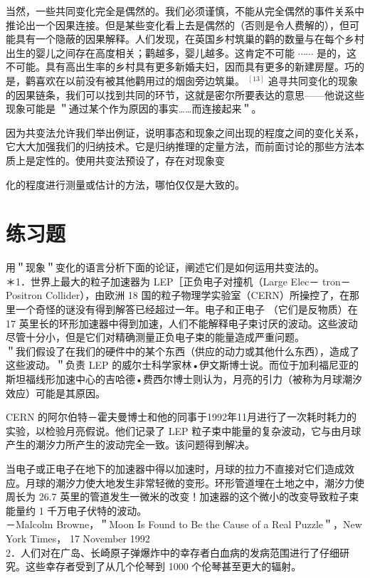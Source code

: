 当然，一些共同变化完全是偶然的。我们必须谨慎，不能从完全偶然的事件关系中推论出一个因果连接。但是某些变化看上去是偶然的（否则是令人费解的），但可能具有一个隐蔽的因果解释。人们发现，在英国乡村筑巢的鹳的数量与在每个乡村出生的婴儿之间存在高度相关；鹳越多，婴儿越多。这肯定不可能 $\cdots \cdots$ 是的，这不可能。具有高出生率的乡村具有更多新婚夫妇，因而具有更多的新建房屋。巧的是，鹳喜欢在以前没有被其他鹳用过的烟囱旁边筑巢。 ${ }^{[13]}$ 追寻共同变化的现象的因果链条，我们可以找到共同的环节，这就是密尔所要表达的意思——他说这些现象可能是 ＂通过某个作为原因的事实……而连接起来＂。

因为共变法允许我们举出例证，说明事态和现象之间出现的程度之间的变化关系，它大大加强我们的归纳技术。它是归纳推理的定量方法，而前面讨论的那些方法本质上是定性的。使用共变法预设了，存在对现象变

化的程度进行测量或估计的方法，哪怕仅仅是大致的。

\section*{练习题}
用＂现象＂变化的语言分析下面的论证，阐述它们是如何运用共变法的。\\
＊1．世界上最大的粒子加速器为 LEP［正负电子对撞机（Large Elec－ tron－Positron Collider），由欧洲 18 国的粒子物理学实验室（CERN）所操控了，在那里一个奇怪的谜没有得到解答已经超过一年。电子和正电子 （它们是反物质）在 17 英里长的环形加速器中得到加速，人们不能解释电子束讨厌的波动。这些波动尽管十分小，但是它们对精确测量正负电子束的能量造成严重问题。\\
＂我们假设了在我们的硬件中的某个东西（供应的动力或其他什么东西），造成了这些波动。＂负责 LEP 的威尔士科学家林•伊文斯博士说。而位于加利福尼亚的斯坦福线形加速中心的吉哈德•费西尔博士则认为，月亮的引力（被称为月球潮汐效应）可能是其原因。

CERN 的阿尔伯特－霍夫曼博士和他的同事于1992年11月进行了一次耗时耗力的实验，以检验月亮假说。他们记录了 LEP 粒子束中能量的复杂波动，它与由月球产生的潮汐力所产生的波动完全一致。该问题得到解决。

当电子或正电子在地下的加速器中得以加速时，月球的拉力不直接对它们造成效应。月球的潮汐力使大地发生非常轻微的变形。环形管道埋在土地之中，潮汐力使周长为 26.7 英里的管道发生一微米的改变！加速器的这个微小的改变导致粒子束能量约 1 千万电子伏特的波动。\\
－Malcolm Browne，＂Moon Is Found to Be the Cause of a Real Puzzle＂，New York Times， 17 November 1992\\
2．人们对在广岛、长崎原子弹爆炸中的幸存者白血病的发病范围进行了仔细研究。这些幸存者受到了从几个伦琴到 1000 个伦琴甚至更大的辐射。

